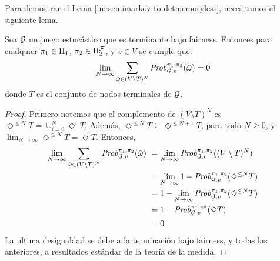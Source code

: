 Para demostrar el Lema \ref{lm:semimarkov-to-detmemoryless},  necesitamos el siguiente lema.



\begin{lemma}\label{lm:sum-of-nonterminal-is-zero}
  Sea $\mathcal{G}$ un juego estocástico que es terminante bajo fairness.
  Entonces para cualquier $\pi_{1} \in \Pi_{1}$,
  $\pi_{2} \in \Pi^{\mathcal{F}}_{2}$, y $v \in V$ se cumple que:
  \[
  \lim_{N \to \infty} \sum_{\hat{\omega} \in (V \setminus T)^N} \mathit{Prob}^{\pi_{1}, \pi_{2}}_{\mathcal{G},v}(\hat{\omega}) = 0
  \]
  donde $T$ es el conjunto de nodos terminales de $\mathcal{G}$.
\end{lemma}
%
\begin{proof}
  Primero notemos que el complemento de $(V \setminus T)^N$ es
  $\Diamond^{\leq N} T = \cup^N_{i=0} \Diamond^i T$.
  Además, $\Diamond^{\leq N} T \subseteq \Diamond^{\leq N+1} T$, para todo $N\geq 0$,
  y $\lim_{N \to \infty} \Diamond^{\leq N} T = \Diamond T$.
  Entonces,
  \begin{align*}
    \lim_{N \to \infty} \sum_{\hat{\omega} \in (V \setminus T)^N} \mathit{Prob}^{\pi_{1}, \pi_{2}}_{\mathcal{G},v}(\hat{\omega}) \
    & = \lim_{N \to \infty} \mathit{Prob}^{\pi_{1}, \pi_{2}}_{\mathcal{G},v}((V \setminus T)^N) \\
    & = \lim_{N \to \infty} 1 - \mathit{Prob}^{\pi_{1}, \pi_{2}}_{\mathcal{G},v}(\Diamond^{\leq N} T ) \\
    & = 1 - \lim_{N \to \infty} \mathit{Prob}^{\pi_{1}, \pi_{2}}_{\mathcal{G},v}(\Diamond^{\leq N} T ) \\
    & = 1 - \mathit{Prob}^{\pi_{1}, \pi_{2}}_{\mathcal{G},v}(\Diamond T ) \\
    & = 0
  \end{align*}
  La ultima desigualdad se debe a la terminación bajo fairness, y todas las anteriores, a resultados estándar de la teoría de la medida.

\end{proof}
